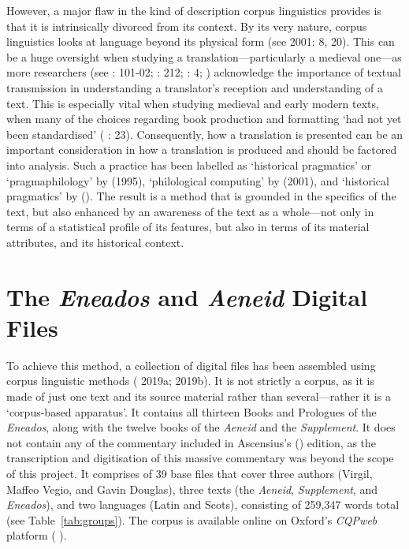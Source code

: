 \documentclass{dhbenelux}
\begin{document}
However, a major flaw in the kind of description corpus linguistics
provides is that it is intrinsically divorced from its context. By its
very nature, corpus linguistics looks at language beyond its physical
form (see \citeauthor{meurman-solin2001structured} 2001: 8, 20). This can 
be a huge oversight when studying a translation---particularly a 
medieval one---as more researchers (see \citeauthor{weitemeir1996} 
\citeyear{weitemeir1996}: 101-02; \citeauthor{smithkay2011} 
\citeyear{smithkay2011}: 212; \citeauthor{kallendorf2015} 
\citeyear{kallendorf2015}: 4; \citeauthor{peikola2017} 
\citeyear{peikola2017}) acknowledge the importance of textual 
transmission in understanding a translator's reception and 
understanding of a text. This is especially vital when studying 
medieval and early modern texts, when many of the choices 
regarding book production and formatting `had not yet been standardised' 
(\citeauthor{moore2017} \citeyear{moore2017}: 23). Consequently, how a 
translation is presented can be an important consideration in how a 
translation is produced and should be factored into analysis. Such a 
practice has been labelled as `historical pragmatics' or `pragmaphilology' 
by \citeauthor{jucker1995} (1995), `philological computing' by 
\citeauthor{meurman-solin2001structured} (2001), and `historical 
pragmatics' by \citeauthor{smith2013} (\citeyear{smith2013}). The result 
is a method that is grounded in the specifics of the text, but also 
enhanced by an awareness of the text as a whole---not only in terms of a 
statistical profile of its features, but also in terms of its material 
attributes, and its historical context.

\section{The \emph{Eneados} and \emph{Aeneid} Digital Files}

To achieve this method, a collection of digital files has been assembled
using corpus linguistic methods (\citeauthor{bushnell2019gd} 2019a; 2019b). It is not strictly a corpus, as it is
made of just one text and its source material rather than
several---rather it is a `corpus-based apparatus'. It contains all
thirteen Books and Prologues of the \emph{Eneados}, along with the
twelve books of the \emph{Aeneid} and the \emph{Supplement}. It does not
contain any of the commentary included in Ascensius's (\citeyear{virgil1501}) edition, as
the transcription and digitisation of this massive commentary was beyond
the scope of this project. It comprises of 39 base files that cover
three authors (Virgil, Maffeo Vegio, and Gavin Douglas), three texts
(the \emph{Aeneid}, \emph{Supplement}, and \emph{Eneados}), and two
languages (Latin and Scots), consisting of 259,347 words total (see
Table~\ref{tab:groups}). The corpus is available online on Oxford's \emph{CQPweb}
platform (\citeauthor{hardie2012} \citeyear{hardie2012}).
\end{document}
